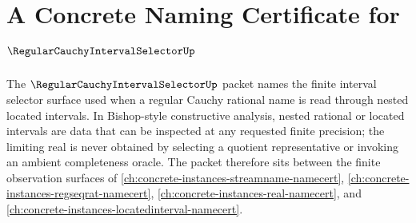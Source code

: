 \chapter{A Concrete Naming Certificate for $\RegularCauchyIntervalSelectorUp$}
\label{ch:concrete-instances-regular-cauchy-interval-selector-namecert}

The $\RegularCauchyIntervalSelectorUp$ packet names the finite interval selector surface used when a regular Cauchy rational name is read through nested located intervals. In Bishop-style constructive analysis, nested rational or located intervals are data that can be inspected at any requested finite precision; the limiting real is never obtained by selecting a quotient representative or invoking an ambient completeness oracle. The packet therefore sits between the finite observation surfaces of \autoref{ch:concrete-instances-streamname-namecert}, \autoref{ch:concrete-instances-regseqrat-namecert}, \autoref{ch:concrete-instances-real-namecert}, and \autoref{ch:concrete-instances-locatedinterval-namecert}.

